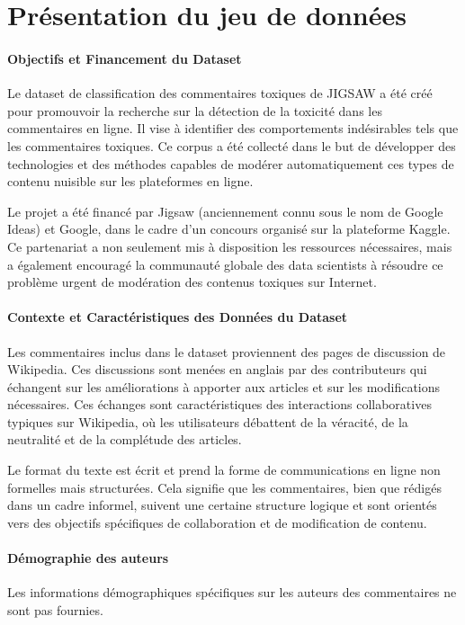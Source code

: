 
\chapter{Présentation du jeu de données}

\subsubsection*{Objectifs et Financement du Dataset}
Le dataset de classification des commentaires toxiques de JIGSAW a été créé pour promouvoir la recherche sur la détection de la toxicité dans les commentaires en ligne.
Il vise à identifier des comportements indésirables tels que les commentaires toxiques.
Ce corpus a été collecté dans le but de développer des technologies et des méthodes capables de modérer automatiquement ces types de contenu nuisible sur les plateformes en ligne.

Le projet a été financé par Jigsaw (anciennement connu sous le nom de Google Ideas) et Google, dans le cadre d'un concours organisé sur la plateforme Kaggle. 
Ce partenariat a non seulement mis à disposition les ressources nécessaires, mais a également encouragé la communauté globale des data scientists à résoudre ce problème urgent de modération des contenus toxiques sur Internet.

\subsubsection*{Contexte et Caractéristiques des Données du Dataset }
Les commentaires inclus dans le dataset proviennent des pages de discussion de Wikipedia. 
Ces discussions sont menées en anglais par des contributeurs qui échangent sur les améliorations à apporter aux articles et sur les modifications nécessaires. 
Ces échanges sont caractéristiques des interactions collaboratives typiques sur Wikipedia, où les utilisateurs débattent de la véracité, de la neutralité et de la complétude des articles.

Le format du texte est écrit et prend la forme de communications en ligne non formelles mais structurées. 
Cela signifie que les commentaires, bien que rédigés dans un cadre informel, suivent une certaine structure logique et sont orientés vers des objectifs spécifiques de collaboration et de modification de contenu.

\subsubsection*{Démographie des auteurs}
Les informations démographiques spécifiques sur les auteurs des commentaires ne sont pas fournies.

